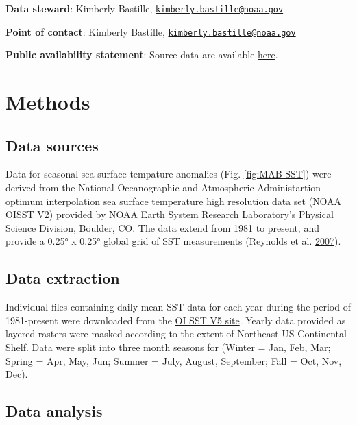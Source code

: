 \documentclass[
]{book}
\begin{document}
\textbf{Data steward}: Kimberly Bastille, \href{mailto:kimberly.bastille@noaa.gov}{\nolinkurl{kimberly.bastille@noaa.gov}}

\textbf{Point of contact}: Kimberly Bastille, \href{mailto:kimberly.bastille@noaa.gov}{\nolinkurl{kimberly.bastille@noaa.gov}}

\textbf{Public availability statement}: Source data are available \href{https://www.esrl.noaa.gov/psd/data/gridded/data.noaa.oisst.v2.highres.html}{here}.

\hypertarget{methods-34}{%
\section{Methods}\label{methods-34}}

\hypertarget{data-sources-34}{%
\subsection{Data sources}\label{data-sources-34}}

Data for seasonal sea surface tempature anomalies (Fig. \ref{fig:MAB-SST}) were derived from the National Oceanographic and Atmospheric Administartion optimum interpolation sea surface temperature high resolution data set (\href{https://www.esrl.noaa.gov/psd/data/gridded/data.noaa.oisst.v2.highres.html}{NOAA OISST V2}) provided by NOAA Earth System Research Laboratory's Physical Science Division, Boulder, CO. The data extend from 1981 to present, and provide a 0.25° x 0.25° global grid of SST measurements (Reynolds et al. \protect\hyperlink{ref-Reynolds2007}{2007}).

\hypertarget{data-extraction-28}{%
\subsection{Data extraction}\label{data-extraction-28}}

Individual files containing daily mean SST data for each year during the period of 1981-present were downloaded from the \href{https://www.esrl.noaa.gov/psd/data/gridded/data.noaa.oisst.v2.highres.html}{OI SST V5 site}. Yearly data provided as layered rasters were masked according to the extent of Northeast US Continental Shelf. Data were split into three month seasons for (Winter = Jan, Feb, Mar; Spring = Apr, May, Jun; Summer = July, August, September; Fall = Oct, Nov, Dec).

\hypertarget{data-analysis-32}{%
\subsection{Data analysis}\label{data-analysis-32}}
\end{document}
